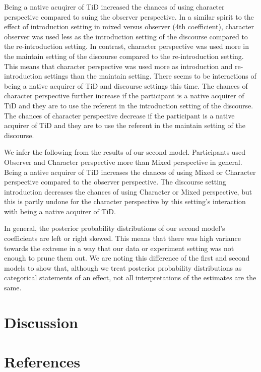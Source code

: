 \documentclass[
  english,
  doc,mask]{apa6}
\begin{document}
Being a native acuqirer of TiD increased the chances of using character perspective compared to suing the observer perspective. In a similar spirit to the effect of introduction setting in mixed versus observer (4th coefficient), character observer was used less as the introduction setting of the discourse compared to the re-introduction setting. In contrast, character perspective was used more in the maintain setting of the discourse compared to the re-introduction setting. This means that character perspective was used more as introduction and re-introduction settings than the maintain setting. There seems to be interactions of being a native acquirer of TiD and discourse settings this time. The chances of character perspective further increase if the participant is a native acquirer of TiD and they are to use the referent in the introduction setting of the discourse. The chances of character perspective decrease if the participant is a native acquirer of TiD and they are to use the referent in the maintain setting of the discourse.

We infer the following from the results of our second model. Participants used Observer and Character perspective more than Mixed perspective in general. Being a native acquirer of TiD increases the chances of using Mixed or Character perspective compared to the observer perspective. The discourse setting introduction decreases the chances of using Character or Mixed perspective, but this is partly undone for the character perspective by this setting's interaction with being a native acquirer of TiD.

In general, the posterior probability distributions of our second model's coefficients are left or right skewed. This means that there was high variance towards the extreme in a way that our data or experiment setting was not enough to prune them out. We are noting this difference of the first and second models to show that, although we treat posterior probability distributions as categorical statements of an effect, not all interpretations of the estimates are the same.

\hypertarget{discussion}{%
\section{Discussion}\label{discussion}}

\newpage

\hypertarget{references}{%
\section{References}\label{references}}
\end{document}
